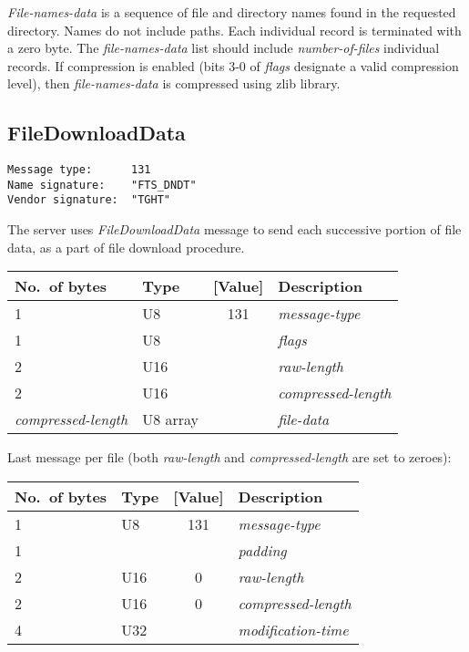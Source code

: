 \documentclass[a4paper]{article}
\newcommand{\typestr}[1]{\textit{#1}}
\begin{document}
\typestr{File-names-data} is a sequence of file and directory names
found in the requested directory. Names do not include paths.
Each individual record is terminated with a zero byte. The
\typestr{file-names-data} list should include
\typestr{number-of-files} individual records. If compression is
enabled (bits 3-0 of \typestr{flags} designate a valid compression
level), then \typestr{file-names-data} is compressed using zlib
library.


\newpage
\subsection{FileDownloadData}
\begin{verbatim}
Message type:      131
Name signature:    "FTS_DNDT"
Vendor signature:  "TGHT"
\end{verbatim}

The server uses \typestr{FileDownloadData} message to send each
successive portion of file data, as a part of file download procedure.

\begin{tabular}{l|lc|l} \hline
No.\ of bytes & Type & [Value] & Description \\ \hline
1 & U8  & 131 & \typestr{message-type} \\
1 & U8  &     & \typestr{flags} \\
2 & U16 &     & \typestr{raw-length} \\
2 & U16 &     & \typestr{compressed-length} \\
\typestr{compressed-length} & U8 array & & \typestr{file-data} \\
\hline\end{tabular}

Last message per file (both \typestr{raw-length} and
\typestr{compressed-length} are set to zeroes):

\begin{tabular}{l|lc|l} \hline
No.\ of bytes & Type & [Value] & Description \\ \hline
1 & U8  & 131 & \typestr{message-type} \\
1 &     &     & \typestr{padding} \\
2 & U16 &   0 & \typestr{raw-length} \\
2 & U16 &   0 & \typestr{compressed-length} \\
4 & U32 &     & \typestr{modification-time} \\
\hline\end{tabular}
\end{document}
